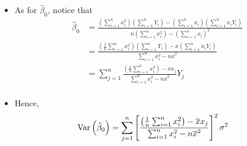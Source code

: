 \begin{frame}[fragile]
\begin{itemize}
	\item As for $\hat{\beta}_0$, notice that
	\begin{align*}
			\hat{\beta}_0 & = \frac{\left(\sum_{i=1}^n x_i^2\right) \left(\sum_{i=1}^n Y_i\right) - \left(\sum_{i=1}^n x_i\right) \left(\sum_{i=1}^n x_iY_i\right)}{n(\sum_{i=1}^n x_i^2) - (\sum_{i=1}^n x_i)^2}\\[1em]
			              & = \frac{\left(\frac{1}{n}\sum_{i=1}^n x_i^2\right) \left(\sum_{i=1}^n Y_i\right) - \overline{x} \left(\sum_{i=1}^n x_iY_i\right)}{\sum_{i=1}^n x_i^2 - n \overline{x}^2}\\[1em]
			              & = \sum_{j=1}^n \frac{\left(\frac{1}{n}\sum_{i=1}^n x_i^2\right)  - \overline{x}  x_j}{\sum_{i=1}^n x_i^2 - n \overline{x}^2}Y_j\\[1em]
	\end{align*}
	\item[] Hence,
	\begin{align*}
		\text{Var}\left(\hat{\beta}_0\right) & = \sum_{j=1}^n \left[\frac{\left(\frac{1}{n}\sum_{i=1}^n x_i^2\right)  - \overline{x}  x_j}{\sum_{i=1}^n x_i^2 - n \overline{x}^2}\right]^2 \sigma^2
	\end{align*}
\end{itemize}
\end{frame}
